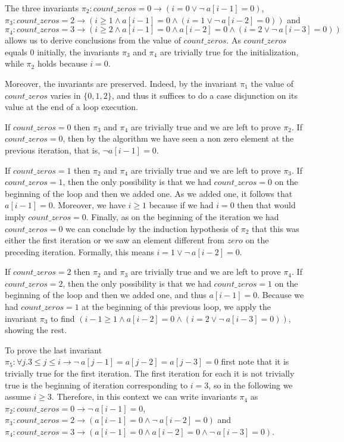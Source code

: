 \documentclass[]{StandardTemplate}
\begin{document}
The three invariants $\pi_2 : count\_zeros = 0 \to (i = 0 \lor \neg~a[i-1]=0) $, $ \pi_3 : count\_zeros = 2 \to (i \geq 1 \land a[i-1]=0 \land (i = 1 \lor \neg~a[i-2]=0)) $ and $ \pi_4 : count\_zeros = 3 \to (i \geq 2 \land a[i-1]=0 \land a[i-2]=0 \land (i = 2 \lor \neg~a[i-3]=0)) $ allows us to derive conclusions from the value of $ count\_zeros $. As $ count\_zeros $ equals $ 0 $ initially, the invariants $ \pi_3 $ and $ \pi_4 $ are trivially true for the initialization, while $ \pi_2 $ holds because $ i=0 $.

Moreover, the invariants are preserved. Indeed, by the invariant $ \pi_1 $ the value of $ count\_zeros $ varies in $ \{0,1,2\} $, and thus it suffices to do a case disjunction on its value at the end of a loop execution.

If $  count\_zeros = 0$ then $ \pi_3 $ and $ \pi_4 $ are trivially true and we are left to prove $ \pi_2 $.  If $ count\_zeros = 0 $, then by the algorithm we have seen a non zero element at the previous iteration, that is, $\neg a[i-1] = 0  $.

If $  count\_zeros = 1$ then $ \pi_2 $ and $ \pi_4 $ are trivially true and we are left to prove $ \pi_3 $.  If $ count\_zeros = 1 $, then the only possibility is that we had $ count\_zeros = 0 $ on the beginning of the loop and then we added one. As we added one, it follows that $ a[i-1] = 0 $. Moreover, we have $ i \geq 1 $ because if we had $ i = 0 $ then that would imply $ count\_zeros = 0 $. Finally, as on the beginning of the iteration we had $ count\_zeros = 0 $ we can conclude by the induction hypothesis of $ \pi_2 $ that this was either the first iteration or we saw an element different from $ zero $ on the preceding iteration. Formally, this means $ i = 1 \lor \neg ~a[i-2]=0 $.

If $  count\_zeros = 2$ then $ \pi_2 $ and $ \pi_3 $ are trivially true and we are left to prove $ \pi_4 $.  If $ count\_zeros = 2 $, then the only possibility is that we had $ count\_zeros = 1 $ on the beginning of the loop and then we added one, and thus $ a[i-1] = 0 $. Because we had $ count\_zeros = 1 $ at the beginning of this previous loop, we apply the invariant $ \pi_3 $ to find $ (i-1 \geq 1 \land a[i-2]=0 \land (i = 2 \lor \neg~a[i-3]=0)) $, showing the rest.

To prove the last invariant $ \pi_5 : \forall j. 3 \leq j \leq i \to \neg ~a[j-1]=a[j-2]=a[j-3] = 0 $ first note that it is trivially true for the first iteration. The first iteration for each it is not trivially true is the beginning of iteration corresponding to $ i = 3 $, so in the following  we assume $ i\geq 3 $. Therefore, in this context we can write invariants $ \pi_4 $ as $\pi_2 : count\_zeros = 0 \to \neg~a[i-1]=0 $, $ \pi_3 : count\_zeros = 2 \to (a[i-1]=0 \land \neg~a[i-2]=0) $ and $ \pi_4 : count\_zeros = 3 \to (a[i-1]=0 \land a[i-2]=0 \land \neg~a[i-3]=0) $.
\end{document}
